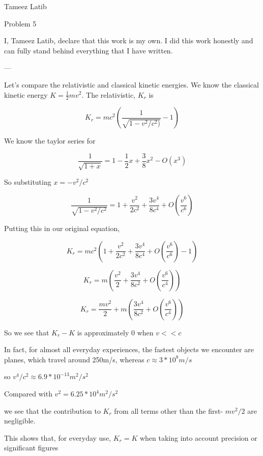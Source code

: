 \documentclass{article}
\begin{document}
Tameez Latib

Problem 5

I, Tameez Latib, declare that this work is my own. I did this work honestly and can fully stand behind everything that I have written.

---

Let's compare the relativistic and classical kinetic energies. We know the classical kinetic energy $K = \frac{1}{2}mv^2$.
The relativistic, $K_r$ is

$$K_r = mc^2(\frac{1}{\sqrt{1-v^2/c^2)}} - 1)$$

We know the taylor series for 

$$\frac{1}{\sqrt{1+x}} = 1 - \frac{1}{2} x + \frac{3}{8} x^2 - O(x^3)$$

So substituting $x = -v^2/c^2$

$$\frac{1}{\sqrt{1-v^2/c^2}} = 1 + \frac{v^2}{2c^2}+ \frac{3v^4}{8c^4} + O(\frac{v^6}{c^6})$$

Putting this in our original equation, 

$$K_r = mc^2(1 + \frac{v^2}{2c^2}+ \frac{3v^4}{8c^4} + O(\frac{v^6}{c^6})- 1)$$

$$K_r = m(\frac{v^2}{2}+ \frac{3v^4}{8c^2} + O(\frac{v^6}{c^4}))$$

$$K_r = \frac{mv^2}{2}+ m(\frac{3v^4}{8c^2} + O(\frac{v^6}{c^4}))$$

So we see that $K_r - K$ is approximately 0 when $v << c$

In fact, for almost all everyday experiences, the fastest objects we encounter are planes, which travel around 250m/s, whereas 
$c \approx 3*10^8 m/s$

so $v^4/c^2 \approx 6.9*10^{-13} m^2/s^2$

Compared with $v^2 = 6.25*10^4 m^2/s^2$

we see that the contribution to $K_r$ from all terms other than the first- $mv^2/2$ are negligible. 

This shows that, for everyday use, $K_r = K$ when taking into account precision or significant figures 
\end{document}
